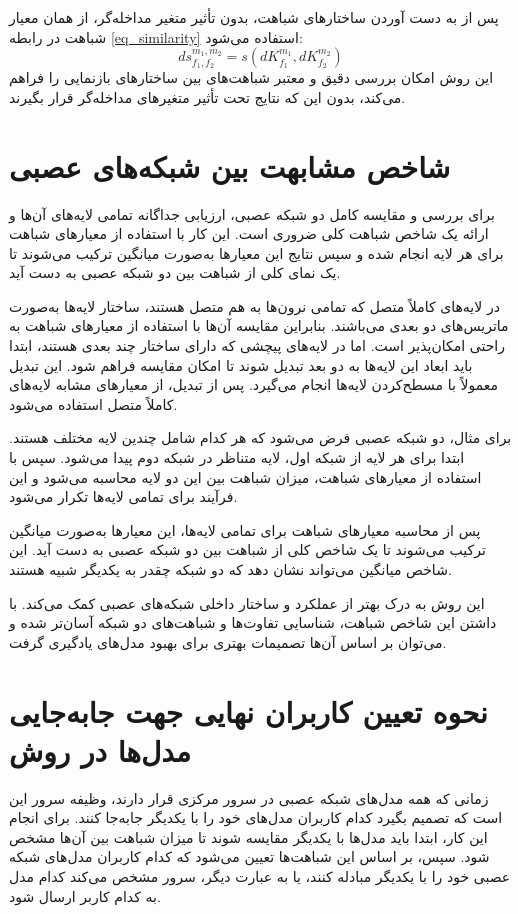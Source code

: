 پس از به دست آوردن ساختارهای شباهت، بدون تأثیر متغیر مداخله‌گر، از همان معیار شباهت در رابطه
\eqref{eq_similarity}
استفاده می‌شود:
\begin{equation}
	ds^{m_1,m_2}_{f_1,f_2} = s(dK^{m_1}_{f_1}, dK^{m_2}_{f_2})
\end{equation}
این روش امکان بررسی دقیق و معتبر شباهت‌های بین ساختارهای بازنمایی را فراهم می‌کند، بدون این که نتایج تحت تأثیر متغیرهای مداخله‌گر قرار بگیرند.



\section{شاخص مشابهت بین شبکه‌های عصبی}
برای بررسی و مقایسه کامل دو شبکه عصبی، ارزیابی جداگانه تمامی لایه‌های آن‌ها و ارائه یک شاخص شباهت کلی ضروری است. این کار با استفاده از معیارهای شباهت برای هر لایه انجام شده و سپس نتایج این معیارها به‌صورت میانگین ترکیب می‌شوند تا یک نمای کلی از شباهت بین دو شبکه عصبی به دست آید.

در لایه‌های کاملاً متصل%
که تمامی نرون‌ها به هم متصل هستند، ساختار لایه‌ها به‌صورت ماتریس‌های دو بعدی می‌باشند. بنابراین مقایسه آن‌ها با استفاده از معیارهای شباهت به راحتی امکان‌پذیر است. اما در لایه‌های پیچشی%
که دارای ساختار چند بعدی هستند، ابتدا باید ابعاد این لایه‌ها به دو بعد تبدیل شوند تا امکان مقایسه فراهم شود. این تبدیل معمولاً با مسطح‌کردن%
لایه‌ها انجام می‌گیرد. پس از تبدیل، از معیارهای مشابه لایه‌های کاملاً متصل استفاده می‌شود.

برای مثال، دو شبکه عصبی فرض می‌شود که هر کدام شامل چندین لایه مختلف هستند. ابتدا برای هر لایه از شبکه اول، لایه متناظر در شبکه دوم پیدا می‌شود. سپس با استفاده از معیارهای شباهت، میزان شباهت بین این دو لایه محاسبه می‌شود و این فرآیند برای تمامی لایه‌ها تکرار می‌شود.

پس از محاسبه معیارهای شباهت برای تمامی لایه‌ها، این معیارها به‌صورت میانگین ترکیب می‌شوند تا یک شاخص کلی از شباهت بین دو شبکه عصبی به دست آید. این شاخص میانگین می‌تواند نشان دهد که دو شبکه چقدر به یکدیگر شبیه هستند.

این روش به درک بهتر از عملکرد و ساختار داخلی شبکه‌های عصبی کمک می‌کند. با داشتن این شاخص شباهت، شناسایی تفاوت‌ها و شباهت‌های دو شبکه آسان‌تر شده و می‌توان بر اساس آن‌ها تصمیمات بهتری برای بهبود مدل‌های یادگیری گرفت.



\section{
	نحوه تعیین کاربران نهایی جهت جابه‌جایی مدل‌ها در روش
}
زمانی که همه مدل‌های شبکه عصبی در سرور مرکزی قرار دارند، وظیفه سرور این است که تصمیم بگیرد کدام کاربران مدل‌های خود را با یکدیگر جابه‌جا کنند. برای انجام این کار، ابتدا باید مدل‌ها با یکدیگر مقایسه شوند تا میزان شباهت بین آن‌ها مشخص شود. سپس، بر اساس این شباهت‌ها تعیین می‌شود که کدام کاربران مدل‌های شبکه عصبی خود را با یکدیگر مبادله کنند، یا به عبارت دیگر، سرور مشخص می‌کند کدام مدل به کدام کاربر ارسال شود.

